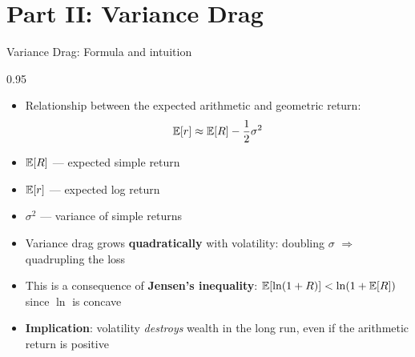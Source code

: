 \documentclass[9pt, aspectratio=169, t]{beamer}
\begin{document}
\section{Part II: Variance Drag}

\begin{frame}{Variance Drag: Formula and intuition}
    \begin{cminipage}{0.95\textwidth}
    \begin{defn}
    \begin{itemize}\setlength{\itemsep}{0pt}
        \item Relationship between the expected arithmetic and geometric return:
        \[
        \mathbb{E}[r] \approx \mathbb{E}[R] - \frac{1}{2}\sigma^2
        \]
        \item $\mathbb{E}[R]$ --- expected simple return
        \item $\mathbb{E}[r]$ --- expected log return
        \item $\sigma^2$ --- variance of simple returns
    \end{itemize}
    \end{defn}
    \vspace{0.2cm}
    \begin{itemize}\setlength{\itemsep}{0pt}
        \item Variance drag grows \textbf{quadratically} with volatility: doubling $\sigma$ $\Rightarrow$ quadrupling the loss
        \item This is a consequence of \textbf{Jensen's inequality}: $\mathbb{E}[\ln(1+R)] < \ln(1+\mathbb{E}[R])$ since $\ln$ is concave
        \item \textbf{Implication}: volatility \textit{destroys} wealth in the long run, even if the arithmetic return is positive
    \end{itemize}
    \end{cminipage}
\end{frame}
\end{document}
